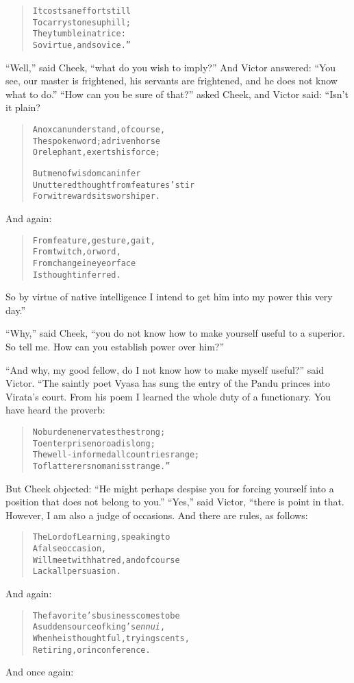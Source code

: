 \documentclass[article, twoside, 14pt]{memoir}
\renewenvironment{verbatim}{%
\begin{quote}%
\vskip -10pt%
\begin{alltt}\normalfont\large}{\end{alltt}%
\end{quote}%
\vskip -10pt
} %
\begin{document}
\begin{verbatim}
It costs an effort still
To carry stones uphill;
They tumble in a trice:
So virtue, and so vice.”
\end{verbatim}
``Well,'' said Cheek, ``what do you wish to imply?'' And Victor
answered:
``You see, our master is frightened, his servants are frightened, and he does not know what to do.''
``How can you be sure of that?'' asked Cheek, and Victor said:
“Isn't it plain?

\begin{verbatim}
An ox can understand, of course,
The spoken word; a driven horse
Or elephant, exerts his force;

But men of wisdom can infer
Unuttered thought from features' stir{\textemdash}
For wit rewards its worshiper.
\end{verbatim}
And again:

\begin{verbatim}
From feature, gesture, gait,
    From twitch, or word,
From change in eye or face
    Is thought inferred.
\end{verbatim}
So by virtue of native intelligence I intend to get him into my
power this very day.”

``Why,'' said Cheek,
``you do not know how to make yourself useful to a superior. So tell me. How can you establish power over him?''

``And why, my good fellow, do I not know how to make myself useful?''
said Victor. “The saintly poet Vyasa has sung the entry of the
Pandu princes into Virata's court. From his poem I learned the
whole duty of a functionary. You have heard the proverb:

\begin{verbatim}
No burden enervates the strong;
To enterprise no road is long;
The well-informed all countries range;
To flatterers no man is strange.”
\end{verbatim}
But Cheek objected:
``He might perhaps despise you for forcing yourself into a position that does not belong to you.''
``Yes,'' said Victor, “there is point in that. However, I am also a
judge of occasions. And there are rules, as follows:

\begin{verbatim}
The Lord of Learning, speaking to
    A false occasion,
Will meet with hatred, and of course
    Lack all persuasion.
\end{verbatim}
And again:

\begin{verbatim}
The favorite's business comes to be
A sudden source of king's \emph{ennui},
When he is thoughtful, trying scents,
Retiring, or in conference.
\end{verbatim}
And once again:
\end{document}
